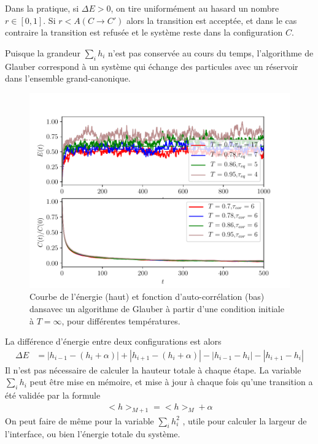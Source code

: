 Dans la pratique, si $\Delta E \greater 0$, on tire uniformément au hasard un nombre $r\in[0,1]$. Si $r\less A(C\to C') $ alors la transition est acceptée,  et dans le cas contraire la transition est refusée et le système reste dans la configuration $C$.

Puisque la grandeur $\sum_i h_i$ n'est pas conservée au cours du temps, l'algorithme de Glauber correspond à un système qui échange des particules avec un réservoir dans l'ensemble grand-canonique.

\begin{figure}
	\centering
	\includegraphics[scale=1]{numerical/sos-glau-eq-cor.pdf}
	\caption{Courbe de l'énergie (haut) et fonction d'auto-corrélation (bas) dansavec un algorithme de Glauber à partir d'une condition initiale à $T=\infty$, pour différentes températures.}
	\label{eq-glau}
\end{figure}

La différence d'énergie entre deux configurations est alors
\begin{align}
	\Delta E &= |h_{i-1}-(h_i + \alpha)| + |h_{i+1}-(h_i + \alpha)| - |h_{i-1}-h_i| - |h_{i+1}-h_i|  
\end{align}
Il n'est pas nécessaire de calculer la hauteur totale à chaque étape. La variable $\sum_i h_i$ peut être mise en mémoire, et mise à jour à chaque fois qu'une transition a été validée par la formule
\begin{align}
    <h>_{M+1} = <h>_M + \alpha
\end{align}
On peut faire de même pour la variable $\sum_i h_i^2$ , utile pour calculer la largeur de l'interface, ou bien l'énergie totale du système.

